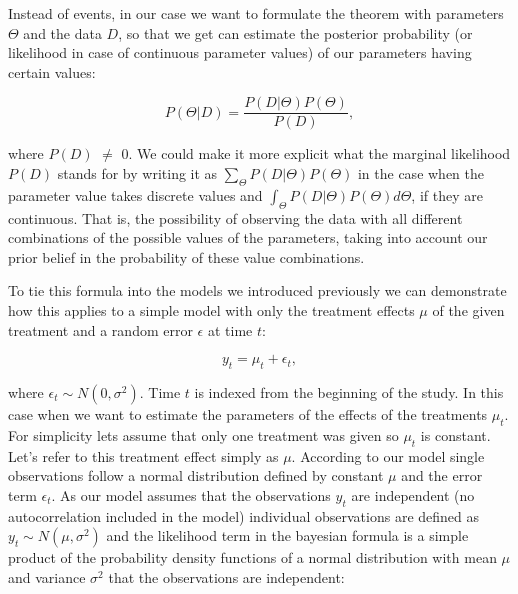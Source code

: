 \documentclass[12pt,a4paper,leqno]{report}
\theoremstyle{plain}
\theoremstyle{definition}
\theoremstyle{remark}
\begin{document}
Instead of events, in our case we want to formulate the theorem with parameters
\(\Theta \) and the data \(D\), so that we get can estimate the posterior
probability (or likelihood in case of continuous parameter values) of our
parameters having certain values:

\begin{def}\label{}
    \begin{equation}\label{bayeswithparams}
        P(\Theta|D) = \frac{P(D|\Theta)P(\Theta)}{P(D)},
    \end{equation}
\end{def}where \(P(D)\) \(\neq \) 0. We could make it more explicit what the marginal likelihood \(P(D)\) stands for
by writing it as \(\sum_\Theta P(D|\Theta)P(\Theta)\) in the case when the parameter
value takes discrete values and \(\int_\Theta P(D|\Theta)P(\Theta) d\Theta \),
if they are continuous. That is, the possibility of observing the data with all
different combinations of the possible values of the parameters, taking into
account our prior belief in the probability of these value combinations.

To tie this formula into the models we introduced previously we can demonstrate
how this applies to a simple model with only the treatment effects \(\mu \) of
the given treatment and a random error \(\epsilon \) at time \(t\):

\begin{def}\label{}
    \begin{equation}\label{}
        y_t = \mu_t + \epsilon_t,
    \end{equation}
\end{def}where \(\epsilon_{t} \sim N(0,\sigma^2)\). Time \(t\) is indexed from
the beginning of the study. In this case when we want to estimate the parameters of the effects of the
treatments \(\mu_t\). For simplicity lets assume that only one treatment was
given so \(\mu_t\) is constant. Let's refer to this treatment effect simply as
\(\mu \). According to our model single observations follow a normal
distribution defined by constant \(\mu \) and the error term \(\epsilon_t \). As
our model assumes that the observations \(y_t\) are independent (no
autocorrelation included in the model) individual observations are defined as
\(y_t \sim N(\mu,\sigma^2) \) and the likelihood term in the bayesian formula is
a simple product of the probability density functions of a normal distribution
with mean \(\mu \) and variance \(\sigma^2 \) that the observations are
independent:
\end{document}
